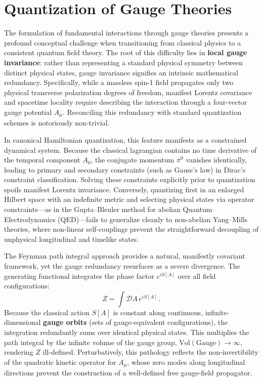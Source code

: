 \section{Quantization of Gauge Theories}

The formulation of fundamental interactions through gauge theories presents a profound conceptual challenge when transitioning from classical physics to a consistent quantum field theory. The root of this difficulty lies in \textbf{local gauge invariance}: rather than representing a standard physical symmetry between distinct physical states, gauge invariance signifies an intrinsic mathematical redundancy. Specifically, while a massless spin-1 field propagates only two physical transverse polarization degrees of freedom, manifest Lorentz covariance and spacetime locality require describing the interaction through a four-vector gauge potential $A_\mu$. Reconciling this redundancy with standard quantization schemes is notoriously non-trivial.

In canonical Hamiltonian quantization, this feature manifests as a constrained dynamical system. Because the classical lagrangian contains no time derivative of the temporal component $A_0$, the conjugate momentum $\pi^0$ vanishes identically, leading to primary and secondary constraints (such as Gauss's law) in Dirac's constraint classification. Solving these constraints explicitly prior to quantization spoils manifest Lorentz invariance. Conversely, quantizing first in an enlarged Hilbert space with an indefinite metric and selecting physical states via operator constraints---as in the Gupta--Bleuler method for abelian Quantum Electrodynamics (QED)---fails to generalize cleanly to non-abelian Yang--Mills theories, where non-linear self-couplings prevent the straightforward decoupling of unphysical longitudinal and timelike states.

The Feynman path integral approach provides a natural, manifestly covariant framework, yet the gauge redundancy resurfaces as a severe divergence. The generating functional integrates the phase factor $e^{iS[A]}$ over all field configurations:
\[
    Z = \int \mathcal{D}A \, e^{iS[A]} \, .
\]
Because the classical action $S[A]$ is constant along continuous, infinite-dimensional \textbf{gauge orbits} (sets of gauge-equivalent configurations), the integration redundantly sums over identical physical states. This multiplies the path integral by the infinite volume of the gauge group, $\mathrm{Vol}(\mathrm{Gauge}) \to \infty$, rendering $Z$ ill-defined. Perturbatively, this pathology reflects the non-invertibility of the quadratic kinetic operator for $A_\mu$, whose zero modes along longitudinal directions prevent the construction of a well-defined free gauge-field propagator.


